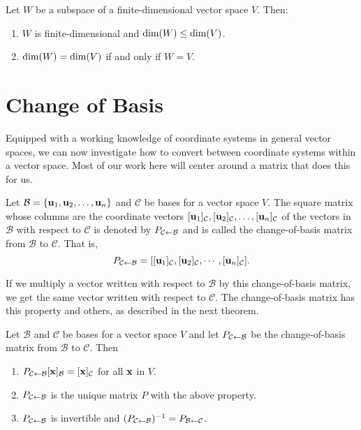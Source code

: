 \documentclass[../m73main.tex]{subfiles}
\begin{document}
\begin{theorem}
	Let $W$ be a subspace of a finite-dimensional vector space $V$.
	Then:
	\begin{enumerate}[label=(\alph*)]
		\item $W$ is finite-dimensional and $\textrm{dim}(W) \leq \textrm{dim}(V)$.
		\item $\textrm{dim}(W) = \textrm{dim}(V)$ if and only if $W = V$.
	\end{enumerate}
\end{theorem}

\section{Change of Basis}
Equipped with a working knowledge of coordinate systems in general vector spaces, we can now investigate how to convert between coordinate systems within a vector space.
Most of our work here will center around a matrix that does this for us.

\begin{definition}
	Let $\mathcal{B} = \{\mathbf{u}_1, \mathbf{u}_2, \ldots, \mathbf{u}_n\}$ and $\mathcal{C}$ be bases for a vector space $V$.
	The square matrix whose columns are the coordinate vectors $[\mathbf{u}_1]_{\mathcal{C}}, [\mathbf{u}_2]_{\mathcal{C}}, \ldots, [\mathbf{u}_n]_{\mathcal{C}}$ of the vectors in $\mathcal{B}$ with respect to $\mathcal{C}$ is denoted by $P_{\mathcal{C} \leftarrow \mathcal{B}}$ and is called the change-of-basis matrix from $\mathcal{B}$ to $\mathcal{C}$.
	That is,
	\[ P_{\mathcal{C} \leftarrow \mathcal{B}} = [[\mathbf{u}_1]_{\mathcal{C}}, [\mathbf{u}_2]_{\mathcal{C}}, \cdots, [\mathbf{u}_n]_{\mathcal{C}}]. \]
\end{definition}

If we multiply a vector written with respect to $\mathcal{B}$ by this change-of-basis matrix, we get the same vector written with respect to $\mathcal{C}$.
The change-of-basis matrix has this property and others, as described in the next theorem.

\begin{theorem}
	Let $\mathcal{B}$ and $\mathcal{C}$ be bases for a vector space $V$ and let $P_{\mathcal{C} \leftarrow \mathcal{B}}$ be the change-of-basis matrix from $\mathcal{B}$ to $\mathcal{C}$.
	Then
	\begin{enumerate}[label=(\alph*)]
		\item $P_{\mathcal{C} \leftarrow \mathcal{B}}[\mathbf{x}]_{\mathcal{B}} = [\mathbf{x}]_{\mathcal{C}}$ for all $\mathbf{x}$ in $V$.
		\item $P_{\mathcal{C} \leftarrow \mathcal{B}}$ is the unique matrix $P$ with the above property.
		\item $P_{\mathcal{C} \leftarrow \mathcal{B}}$ is invertible and $(P_{\mathcal{C} \leftarrow \mathcal{B}})^{-1} = P_{\mathcal{B} \leftarrow \mathcal{C}}$.
	\end{enumerate}
\end{theorem}
\end{document}
